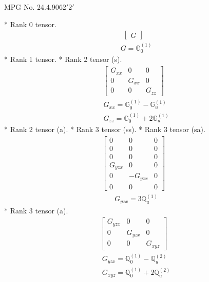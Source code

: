 \documentclass[fleqn,8pt,landscape]{jsarticle}
\begin{document}
\setcounter{MaxMatrixCols}{32}

\renewcommand{\tablename}{Table~}
\renewcommand{\figurename}{Figure~}
\begin{center}
\LARGE
MPG No. 24.4.90\quad$62'2'$
\end{center}
* Rank 0 tensor.
\begin{align*}
\begin{bmatrix} G \end{bmatrix}
\end{align*}
\begin{align*}
& G = \mathbb{G}_{0}^{(1)}
\end{align*}
* Rank 1 tensor.
* Rank 2 tensor (s).
\begin{align*}
\begin{bmatrix} G_{xx} & 0 & 0 \\ 0 & G_{xx} & 0 \\ 0 & 0 & G_{zz} \end{bmatrix}
\end{align*}
\begin{align*}
& G_{xx} = \mathbb{G}_{0}^{(1)} - \mathbb{G}_{u}^{(1)} \\
& G_{zz} = \mathbb{G}_{0}^{(1)} + 2 \mathbb{G}_{u}^{(1)}
\end{align*}
* Rank 2 tensor (a).
* Rank 3 tensor (ss).
* Rank 3 tensor (sa).
\begin{align*}
\begin{bmatrix} 0 & 0 & 0 \\ 0 & 0 & 0 \\ 0 & 0 & 0 \\ G_{yzx} & 0 & 0 \\ 0 & - G_{yzx} & 0 \\ 0 & 0 & 0 \end{bmatrix}
\end{align*}
\begin{align*}
& G_{yzx} = 3 \mathbb{Q}_{u}^{(1)}
\end{align*}
* Rank 3 tensor (a).
\begin{align*}
\begin{bmatrix} G_{yzx} & 0 & 0 \\ 0 & G_{yzx} & 0 \\ 0 & 0 & G_{xyz} \end{bmatrix}
\end{align*}
\begin{align*}
& G_{yzx} = \mathbb{Q}_{0}^{(1)} - \mathbb{Q}_{u}^{(2)} \\
& G_{xyz} = \mathbb{Q}_{0}^{(1)} + 2 \mathbb{Q}_{u}^{(2)}
\end{align*}
\end{document}
